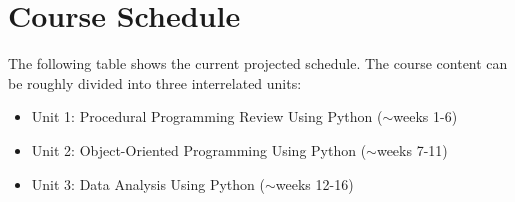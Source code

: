 \documentclass[11pt]{article}
\begin{document}
\clearpage
\section{Course Schedule}
The following table shows the current projected schedule. The course content can be roughly divided into three interrelated units:

\begin{itemize}
	\item Unit 1: Procedural Programming Review Using Python ($\sim$weeks 1-6)
	\item Unit 2: Object-Oriented Programming Using Python ($\sim$weeks 7-11)
	\item Unit 3: Data Analysis Using Python ($\sim$weeks 12-16)
\end{itemize}

\end{document}

